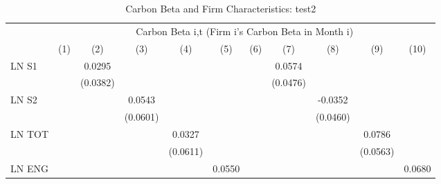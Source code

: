 \begin{table}[htbp]\centering
\def\sym#1{\ifmmode^{#1}\else\(^{#1}\)\fi}
\caption{Carbon Beta and Firm Characteristics: test2}
\begin{tabular}{l*{10}{c}}
\hline\hline
                &\multicolumn{10}{c}{Carbon Beta i,t (Firm i's Carbon Beta in Month i)}                                                                                                                       \\\cmidrule(lr){2-11}
                &\multicolumn{1}{c}{(1)}         &\multicolumn{1}{c}{(2)}         &\multicolumn{1}{c}{(3)}         &\multicolumn{1}{c}{(4)}         &\multicolumn{1}{c}{(5)}         &\multicolumn{1}{c}{(6)}         &\multicolumn{1}{c}{(7)}         &\multicolumn{1}{c}{(8)}         &\multicolumn{1}{c}{(9)}         &\multicolumn{1}{c}{(10)}         \\
\hline
LN S1           &                  &   0.0295         &                  &                  &                  &                  &   0.0574         &                  &                  &                  \\
                &                  & (0.0382)         &                  &                  &                  &                  & (0.0476)         &                  &                  &                  \\
LN S2           &                  &                  &   0.0543         &                  &                  &                  &                  &  -0.0352         &                  &                  \\
                &                  &                  & (0.0601)         &                  &                  &                  &                  & (0.0460)         &                  &                  \\
LN TOT          &                  &                  &                  &   0.0327         &                  &                  &                  &                  &   0.0786         &                  \\
                &                  &                  &                  & (0.0611)         &                  &                  &                  &                  & (0.0563)         &                  \\
LN ENG          &                  &                  &                  &                  &   0.0550         &                  &                  &                  &                  &   0.0680         \\

\end{tabular}
\end{table}
